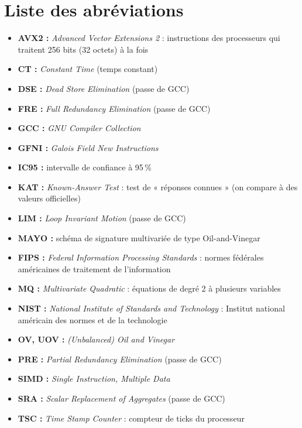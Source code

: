 \chapter*{Liste des abréviations}
\label{chap:abbreviations}
\begin{itemize}
\item[•] \textbf{AVX2 :} \emph{Advanced Vector Extensions 2} : instructions des processeurs qui traitent 256 bits (32 octets) à la fois
\item[•] \textbf{CT :} \emph{Constant Time} (temps constant)
\item[•] \textbf{DSE :} \emph{Dead Store Elimination} (passe de GCC)
\item[•] \textbf{FRE :} \emph{Full Redundancy Elimination} (passe de GCC)
\item[•] \textbf{GCC :} \emph{GNU Compiler Collection}
\item[•] \textbf{GFNI :} \emph{Galois Field New Instructions}
\item[•] \textbf{IC95 :} intervalle de confiance à 95\,\%
\item[•] \textbf{KAT :} \emph{Known-Answer Test} : test de « réponses connues » (on compare à des valeurs officielles)
\item[•] \textbf{LIM :} \emph{Loop Invariant Motion} (passe de GCC)
\item[•] \textbf{MAYO :} schéma de signature multivariée de type Oil-and-Vinegar
\item[•] \textbf{FIPS :} \emph{Federal Information Processing Standards} : normes fédérales américaines de traitement de l'information
\item[•] \textbf{MQ :} \emph{Multivariate Quadratic} : équations de degré 2 à plusieurs variables
\item[•] \textbf{NIST :} \emph{National Institute of Standards and Technology} : Institut national américain des normes et de la technologie
\item[•] \textbf{OV, UOV :} \emph{(Unbalanced) Oil and Vinegar}
\item[•] \textbf{PRE :} \emph{Partial Redundancy Elimination} (passe de GCC)
\item[•] \textbf{SIMD :} \emph{Single Instruction, Multiple Data}
\item[•] \textbf{SRA :} \emph{Scalar Replacement of Aggregates} (passe de GCC)
\item[•] \textbf{TSC :} \emph{Time Stamp Counter} : compteur de ticks du processeur
\end{itemize}
\clearpage
